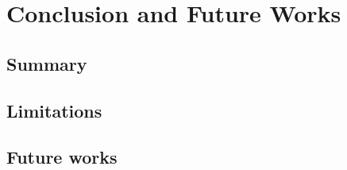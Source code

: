 \documentclass[letterpaper,12pt,titlepage,oneside,final]{book}
\begin{document}
\chapter{Conclusion and Future Works}

\section{Summary}

\section{Limitations}

\section{Future works}


\appendix
\end{document}
